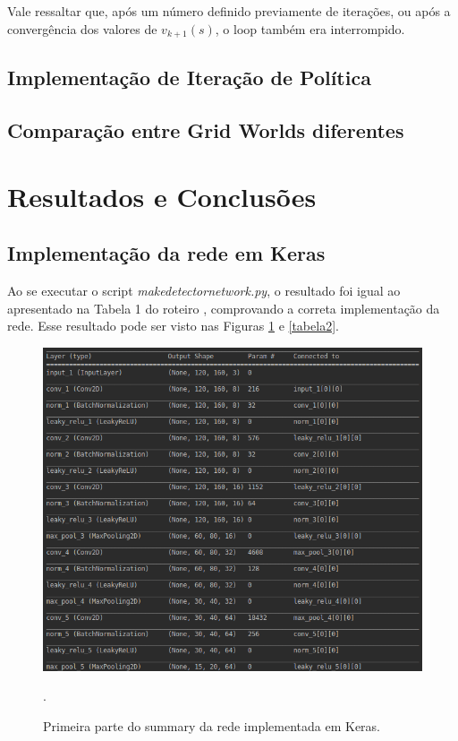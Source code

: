 \documentclass[conference]{IEEEtran}
\begin{document}
Vale ressaltar que, após um número definido previamente de iterações, ou após a convergência dos valores de $v_{k+1}(s)$, o loop também era interrompido.

\subsection{Implementação de Iteração de Política}

\subsection{Comparação entre Grid Worlds diferentes}

\section{Resultados e Conclusões}

\subsection{Implementação da rede em Keras}
Ao se executar o script \textit{make\underline{\space}detector\underline{\space}network.py}, o resultado foi igual ao apresentado na Tabela 1 do roteiro \cite{roteiro}, comprovando a correta implementação da rede. Esse resultado pode ser visto nas Figuras \ref{tabela1} e \ref{tabela2}.

\begin{figure}[htbp]
\centering
\centerline{\includegraphics[scale=0.35]{imagens/tabela1.png}}
\caption{Primeira parte do summary da rede implementada em Keras.}.
\label{tabela1}
\end{figure}
\end{document}
